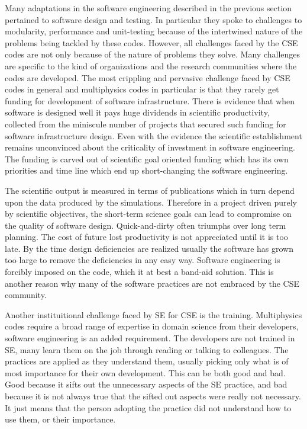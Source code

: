 
Many adaptations in the software engineering described in the previous
section pertained to software design and testing. In particular they
spoke to challenges to modularity, performance and unit-testing because of the
intertwined nature of the problems being tackled by these
codes. However, all challenges faced by the CSE codes are not only
because of the nature of problems they solve. Many challenges are
specific to the kind of organizations and the research communities
where the codes are developed. The most crippling and pervasive
challenge faced by CSE codes in general and multiphysics codes in
particular is that they rarely get funding for development of software
infrastructure. There is evidence that when software is designed well
it pays huge dividends in scientific productivity, collected from the
miniscule number of projects that secured such funding for software
infrastructure design. Even with the evidence the scientific
establishment remains unconvinced about the criticality of investment
in software engineering. The funding is carved out of scientific goal
oriented funding which has its own priorities and time line which end
up short-changing the software engineering.


The scientific output is measured in terms of publications which in
turn depend upon the data produced by the simulations. Therefore in a
project driven purely by scientific objectives, the short-term science
goals can lead to compromise on the quality of software
design. Quick-and-dirty often triumphs over long term planning. The
cost of future lost productivity is not appreciated until it is too
late. By the time design deficiencies are realized usually the
software has grown too large to remove the deficiencies in any easy
way.  Software engineering is forcibly imposed on the code, which it
at best a band-aid solution. This is another reason why many of the
software practices are not embraced by the CSE community. 

Another instituitional challenge faced by SE for CSE is the
training. Multiphysics codes require a broad range of expertise in
domain science from their developers, software engineering is an added
requirement. The developers are not trained in SE, many learn them on
the job through reading or talking to colleagues. The practices are
applied as they understand them, usually picking only what is of most
importance for their own development. This can be both good and
bad. Good because it sifts out the unnecessary aspects of the SE
practice, and bad because it is not always true that the sifted out
aspects were really not necessary. It just means that the person
adopting the practice did not understand how to use them, or their
importance. 

